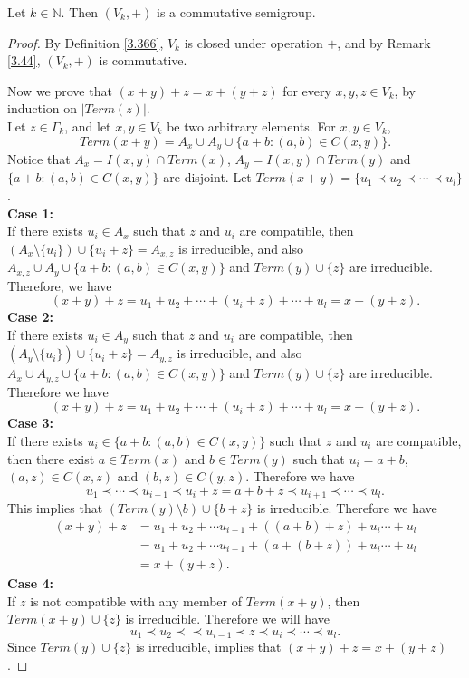 \documentclass[10pt,a4paper]{amsart}
\begin{document}
\begin{theorem}{\label{3.66}}
	Let $k\in\mathbb{N}$. Then $(V_k,+)$ is a commutative semigroup.
\end{theorem}

\begin{proof}
	By Definition \ref{3.366}, $V_k$ is closed under operation $+$, and by Remark \ref{3.44}, $(V_k,+)$ is commutative.
	
	Now we prove that $(x+y)+z=x+(y+z)$ for every $x,y,z\in V_k$, by induction on $|Term(z)|$.\\
	Let $z\in \Gamma_k$, and let $x,y\in V_k$ be two arbitrary elements. For $x,y\in V_k$, 
	\[
	Term(x+y)=A_x\cup A_y\cup\{a+b:(a,b)\in C(x,y)\}.
	\]
	Notice that $A_x=I(x,y)\cap Term(x)$, $A_y=I(x,y)\cap Term(y)$ and $\{a+b:(a,b)\in C(x,y)\}$ are disjoint. Let $Term(x+y)=\{u_1\prec u_2\prec\cdots\prec u_l\}$.\\
	{\bf{ Case 1:}}\\
	If there exists $u_i\in A_x$ such that $z$ and $u_i$ are compatible, then $(A_x\setminus\{u_i\})\cup\{u_i+z\}=A_{x,z}$ is irreducible, and also  $A_{x,z}\cup A_y\cup\{a+b:(a,b)\in C(x,y)\}$  and $Term(y)\cup\{z\}$  are irreducible. Therefore, we have 
	\[
	(x+y)+z=u_1+u_2+\cdots+(u_i+z)+\cdots+u_l=x+(y+z).
	\]
	{\bf{ Case 2:}}\\	
	If there exists $u_i\in A_y$ such that $z$ and $u_i$ are compatible, then $(A_y\setminus\{u_i\})\cup\{u_i+z\}=A_{y,z}$ is irreducible, and also  $A_{x}\cup A_{y,z}\cup\{a+b:(a,b)\in C(x,y)\}$  and $Term(y)\cup\{z\}$  are irreducible. Therefore we have 
	\[
	(x+y)+z=u_1+u_2+\cdots+(u_i+z)+\cdots+u_l=x+(y+z).
	\]
	{\bf{ Case 3:}}\\	
	If there exists $u_i\in \{a+b:(a,b)\in C(x,y)\}$ such that $z$ and $u_i$ are compatible, then there exist $a\in Term(x)$ and $b\in Term(y)$ such that $u_i=a+b$, $(a,z)\in C(x,z)$ and $(b,z)\in C(y,z)$.  Therefore we have 
	\[
	u_1\prec\cdots\prec u_{i-1}\prec u_i+z=a+b+z\prec u_{i+1}\prec \cdots\prec u_l.
	\]
	This implies that $(Term(y)\setminus{b})\cup\{b+z\}$ is irreducible. Therefore we have 
	\begin{align*}
		(x+y)+z&=u_1+u_2+\cdots u_{i-1}+((a+b)+z)+u_{i}\cdots+u_l\\
		&=u_1+u_2+\cdots u_{i-1}+(a+(b+z))+u_{i}\cdots+u_l\\
		&=x+(y+z).
	\end{align*}	
	{\bf{ Case 4:}}\\	
	If $z$ is not compatible with any member of $Term(x+y)$, then $Term(x+y)\cup\{z\}$ is irreducible. Therefore we will have
	\[
	u_1\prec u_2\prec\prec u_{i-1}\prec z\prec u_i\prec\cdots\prec u_l.
	\]
	Since $Term(y)\cup\{z\}$ is irreducible, implies that $(x+y)+z=x+(y+z)$.
	

\end{proof}
\end{document}
